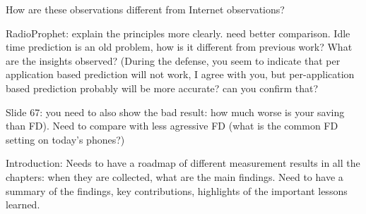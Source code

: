 {How are these observations different from Internet observations?

RadioProphet:  explain the principles more clearly.  need better comparison.
Idle time prediction is an old problem, how is it different from previous work?
What are the insights observed?
(During the defense, you seem to indicate that per application based prediction will not work, I agree with you, but per-application based prediction probably will be more accurate?  can you confirm that?

Slide 67: you need to also show the bad result: how much worse is your saving than FD).
Need to compare with less agressive FD (what is the common FD setting on today's phones?)

Introduction:
Needs to have a roadmap of different measurement results in all the chapters: when they are collected, what are the main findings.
Need to have a summary of the findings, key contributions, highlights of the important lessons learned.

}

\label{Abstract}
